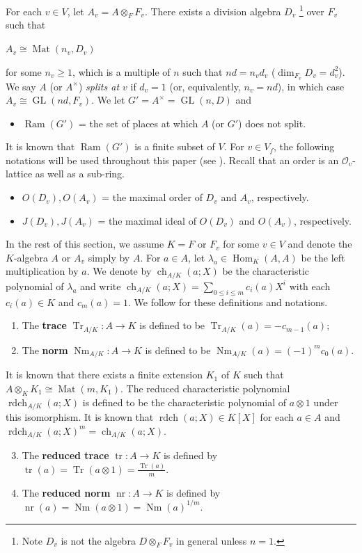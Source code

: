 \documentclass[11pt]{article}
\theoremstyle{plain}
\theoremstyle{remark}
\theoremstyle{definition}
\DeclareMathOperator{\Hom}{Hom}
\DeclareMathOperator{\tr}{tr}
\DeclareMathOperator{\Tr}{Tr}
\DeclareMathOperator{\Nm}{Nm}
\DeclareMathOperator{\ch}{ch}
\DeclareMathOperator{\GL}{GL}
\DeclareMathOperator{\Mt}{Mat}
\DeclareMathOperator{\rdch}{rdch}
\DeclareMathOperator{\ram}{Ram}
\DeclareMathOperator{\nr}{nr}
\begin{document}
For each $v\in V$, let $A_v=A\otimes_F F_v$. 
There exists a division algebra $D_v$ 
\footnote{Note $D_v$ is not the algebra $D\otimes_{F}F_v$ in general unless $n=1$. } 
over $F_v$ such that
\begin{center}
    $A_v\cong \Mt(n_v,D_v)$
\end{center}
for some $n_v\geq 1$, which is a multiple of $n$ such that $nd=n_v d_v$ ($\dim_{F_v}D_v=d_v^2$). 
We say $A$ (or $A^{\times}$) {\it splits at $v$} if $d_v=1$ (or, equivalently, $n_v=nd$), in which case $A_v\cong \GL(nd,F_v)$. 
We let $G'=A^{\times}=\GL(n,D)$ and
\begin{itemize}
    \item $\ram(G')$ = the set of places at which $A$ (or $G'$) does not split.
\end{itemize}
It is known that $\ram(G')$ is a finite subset of $V$. 
For $v\in V_f$, the following notations will be used throughout this paper (see \cite{Voight21}).  
Recall that an order is an $\mathcal{O}_v$-lattice as well as a sub-ring. 
\begin{itemize}
    \item $O(D_v),O(A_v)$ = the maximal order of $D_v$ and $A_v$, respectively. 
    \item $J(D_v),J(A_v)$ = the maximal ideal of $O(D_v)$ and $O(A_v)$, respectively. 
\end{itemize}


In the rest of this section, we assume $K=F$ or $F_v$ for some $v\in V$ and denote the $K$-algebra $A$ or $A_v$ simply by $A$. 
For $a\in A$, let $\lambda_a\in \Hom_{K}(A,A)$ be the left multiplication by $a$. 
We denote by $\ch_{A/K}(a;X)$ be the characteristic polynomial of $\lambda_a$ and  write $\ch_{A/K}(a;X)=\sum_{0\leq i\leq m}c_i(a) X^i$ with each $c_i(a)\in K$ and $c_m(a)=1$. 
We follow \cite[\S 2]{Rei03} for these definitions and notations.  
\begin{enumerate}
    \item The \textbf{trace} $\Tr_{A/K}\colon A\to K$ is defined to be $\Tr_{A/K}(a)=-c_{m-1}(a)$;
    \item The \textbf{norm} $\Nm_{A/K}\colon A\to K$ is defined to be $\Nm_{A/K}(a)=(-1)^m c_{0}(a)$. 
\end{enumerate}
It is known that there exists a finite extension $K_1$ of $K$ such that $A\otimes_K K_1\cong \Mt(m,K_1)$. 
The reduced characteristic polynomial $\rdch_{A/K}(a;X)$ is defined to be the characteristic polynomial of $a\otimes 1$ under this isomorphism. 
It is known that $\rdch(a;X)\in K[X]$ for each $a\in A$ and $\rdch_{A/K}(a;X)^m=\ch_{A/K}(a;X)$. 
\begin{enumerate}
\setcounter{enumi}{2}
    \item The \textbf{reduced trace} $\tr\colon A\to K$ is defined by $\tr(a)=\Tr(a\otimes 1)=\frac{\Tr(a)}{m}$.
    \item The \textbf{reduced norm} $\nr\colon A\to K$ is defined by $\nr(a)=\Nm(a\otimes 1)=\Nm(a)^{1/m}$.
\end{enumerate}
\end{document}

